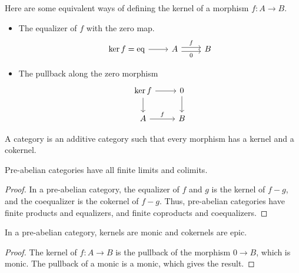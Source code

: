 \documentclass[main.tex]{subfiles}
\begin{document}
Here are some equivalent ways of defining the kernel of a morphism $f\colon A \to B$.
\begin{itemize}
  \item The equalizer of $f$ with the zero map.
    \begin{equation*}
      \begin{tikzcd}
        \ker f = \mathrm{eq}
        \arrow[r]
        & A
        \arrow[r, shift left, "f"]
        \arrow[r, shift right, swap, "0"]
        & B
      \end{tikzcd}
    \end{equation*}

  \item The pullback along the zero morphism
    \begin{equation*}
      \begin{tikzcd}
        \ker f
        \arrow[r]
        \arrow[d]
        & 0
        \arrow[d]
        \\
        A
        \arrow[r, "f"]
        & B
      \end{tikzcd}
    \end{equation*}
\end{itemize}

\begin{definition}
  \label{def:pre_abelian_category}
  A  category is an additive category such that every morphism has a kernel and a cokernel.
\end{definition}

\begin{lemma}
  \label{lemma:pre_abelian_categories_have_finite_limits_and_colimits}
  Pre-abelian categories have all finite limits and colimits.
\end{lemma}
\begin{proof}
  In a pre-abelian category, the equalizer of $f$ and $g$ is the kernel of $f-g$, and the coequalizer is the cokernel of $f-g$. Thus, pre-abelian categories have finite products and equalizers, and finite coproducts and coequalizers.
\end{proof}

\begin{proposition}
  In a pre-abelian category, kernels are monic and cokernels are epic.
\end{proposition}
\begin{proof}
  The kernel of $f\colon A \to B$ is the pullback of the morphism $0 \to B$, which is monic. The pullback of a monic is a monic, which gives the result.
\end{proof}
\end{document}
